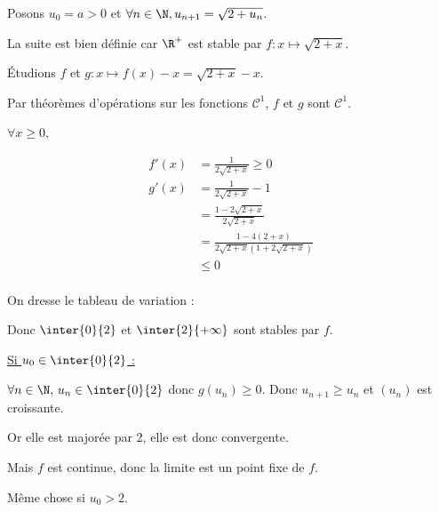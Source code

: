 \begin{exemple}
    Posons $u_0 = a > 0$ et $\forall n \in \N, u_{n + 1} = \sqrt{2 + u_n}$. 

    La suite est bien définie car $\R^+$ est stable par $f: x \mapsto \sqrt{2 + x}$. 

    Étudions $f$ et $g: x \mapsto f(x) - x = \sqrt{2 + x} - x$.

    Par théorèmes d'opérations sur les fonctions $\mathscr C^1$, $f$ et $g$ sont $\mathscr C^1$. 

    $\forall x  \geqslant 0,$

    \begin{align*}
        f'(x) & = \frac 1 {2\sqrt{2 + x}} \geqslant 0 \\
        g'(x) & = \frac 1 {2\sqrt{2 + x}} - 1 \\
        & = \frac{1 - 2 \sqrt{2 + x}}{2 \sqrt{2 + x}} \\
        & = \frac{1 - 4(2 + x)}{2 \sqrt{2 + x}\left(1 + 2\sqrt{2 + x}\right)} \\
        & \leqslant 0 \\
    \end{align*}

    On dresse le tableau de variation :
    \begin{center}
    \end{center}

    Donc $\inter{0}{2}$ et $\inter{2}{+\infty}$ sont stables par $f$.

    \uline{Si $u_0 \in \inter{0}{2}$ :}

    \avspace $\forall n \in \N, \, u_n \in \inter{0}{2}$ donc $g(u_n) \geqslant 0$. 
    Donc $u_{n + 1} \geqslant u_n$ et $(u_n)$ est croissante. 

    Or elle est majorée par 2, elle est donc convergente. 

    Mais $f$ est continue, donc la limite est un point fixe de $f$.

    Même chose si $u_0 > 2$. 
\end{exemple}

